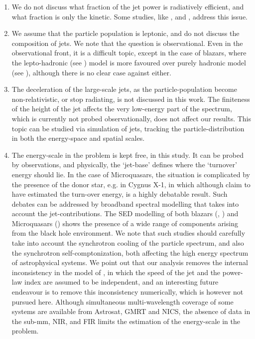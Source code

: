 \begin{enumerate}
\item We do not discuss what fraction of the jet power is radiatively efficient, and what fraction is only the kinetic. Some studies, like \citealt{Heinz-2006-ApJ}, \citep{Gallo_et_al.-2005-Nature} and \citealt{Malzac_Belmont_Fabian-2009-MNRAS}, address this issue.

\item We assume that the particle population is leptonic, and do not discuss the composition of jets. We note that the question is observational. Even in the observational front, it is a difficult topic, except in the case of blazars, where the lepto-hadronic (see \citealt{Sahayanathan_&_Godambe-2012-MNRAS}) model is more favoured over purely hadronic model (see \citealt{Paliya_et_al.-2016-arXiv}), although there is no clear case against either.

\item The deceleration of the large-scale jets, as the particle-population become non-relativistic, or stop radiating, is not discussed in this work. The finiteness of the height of the jet affects the very low-energy part of the spectrum, which is currently not probed observationally, does not affect our results. This topic can be studied via simulation of jets, tracking the particle-distribution in both the energy-space and spatial scales.

\item The energy-scale in the problem is kept free, in this study. It can be probed by observations, and physically, the `jet-base' defines where the `turnover' energy should lie. In the case of Microquasars, the situation is complicated by the presence of the donor star, e.g. in Cygnus X-1, in which although \citealt{Rahoui_et_al.-2011} claim to have estimated the turn-over energy, is a highly debatable result. Such debates can be addressed by broadband spectral modelling that takes into account the jet-contributions. The SED modelling of both blazars (\citealt{Joshi_&_Bottcher-2007-ApJ}, \citealt{Paliya_et_al.-2015-ApJ}) and Microquasars (\citealt{Zdziarski_et_al.-2014_b-MNRAS}) shows the presence of a wide range of  components arising from the black hole environment.  We note that such studies should carefully take into account the synchrotron cooling of the particle spectrum, and also the synchrotron self-comptonization, both affecting the high energy spectrum of astrophysical systems. We point out that our analysis removes the internal inconsistency in the model of \citealt{Zdziarski_et_al.-2014_a-MNRAS}, in which the speed of the jet and the power-law index are assumed to be independent, and an interesting future endeavour is to remove this inconsistency numerically, which is however not pursued here. Although simultaneous multi-wavelength coverage of some systems are available from Astrosat, GMRT and NICS, the absence of data in the sub-mm, NIR, and FIR limits the estimation of the energy-scale in the problem.


\end{enumerate}
